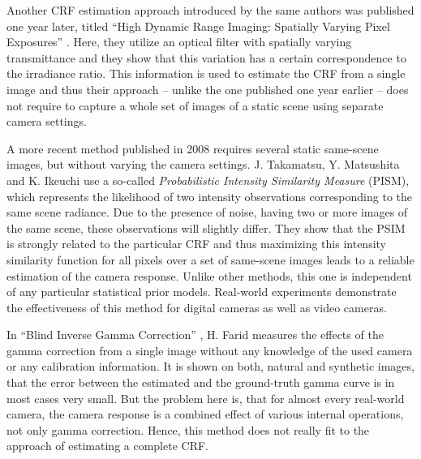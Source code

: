 Another CRF estimation approach introduced by the same authors was published one year later, titled ``High Dynamic Range Imaging: Spatially Varying Pixel Exposures'' \cite{nayar2000high}. Here, they utilize an optical filter with spatially varying transmittance and they show that this variation has a certain correspondence to the irradiance ratio. This information is used to estimate the CRF from a single image and thus their approach -- unlike the one published one year earlier -- does not require to capture a whole set of images of a static scene using separate camera settings.

A more recent method published in 2008 \cite{takamatsu2008estimatingECCV} requires several static same-scene images, but without varying the camera settings. J. Takamatsu, Y. Matsushita and K. Ikeuchi use a so-called \emph{Probabilistic Intensity Similarity Measure} (PISM), which represents the likelihood of two intensity observations corresponding to the same scene radiance. Due to the presence of noise, having two or more images of the same scene, these observations will slightly differ. They show that the PSIM is strongly related to the particular CRF and thus maximizing this intensity similarity function for all pixels over a set of same-scene images leads to a reliable estimation of the camera response. Unlike other methods, this one is independent of any particular statistical prior models. Real-world experiments demonstrate the effectiveness of this method for digital cameras as well as video cameras.

In ``Blind Inverse Gamma Correction'' \cite{farid2001aa}, H. Farid measures the effects of the gamma correction from a single image without any knowledge of the used camera or any calibration information. It is shown on both, natural and synthetic images, that the error between the estimated and the ground-truth gamma curve is in most cases very small. But the problem here is, that for almost every real-world camera, the camera response is a combined effect of various internal operations, not only gamma correction. Hence, this method does not really fit to the approach of estimating a complete CRF.





